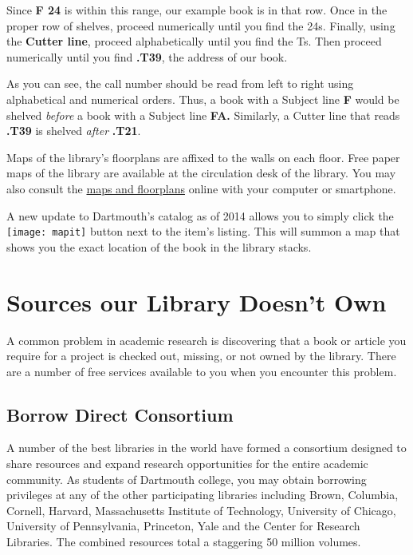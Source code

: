 Since \textbf{F 24} is within this range, our example book is in that row. Once
in the proper row of shelves, proceed numerically until you find the 24s.
Finally, using the \textbf{Cutter line}, proceed alphabetically until you find
the Ts. Then proceed numerically until you find \textbf{.T39}, the address of our book.

As you can see, the call number should be read from left to right using
alphabetical and numerical orders. Thus, a book with a Subject line \textbf{F
}would be shelved \emph{before} a book with a Subject line \textbf{FA.}
Similarly, a Cutter line that reads \textbf{.T39} is shelved \emph{after}
\textbf{.T21}.

Maps of the library's floorplans are affixed to the walls on each floor. Free
paper maps of the library are available at the circulation desk of the library.
You may also consult the
\href{http://www.dartmouth.edu/~library/bakerberry/circ/stacksguides/}{maps and
floorplans} online with your computer or smartphone.

\begin{center}
\begin{tcolorbox}[colframe=oyster, coltitle=black, sharp corners, title=\ding{52} Note]
A new update to Dartmouth's catalog as of 2014
allows you to simply click the \texttt{[image: mapit]} button next
to the item's listing. This will summon a map that shows you the exact location
of the book in the library stacks.
\end{tcolorbox}
\end{center}

\section{Sources our Library Doesn't Own}

A common problem in academic research is discovering that a book or article you
require for a project is checked out, missing, or not owned by the library.
There are a number of free services available to you when you encounter this
problem.

\subsection{Borrow Direct Consortium}

A number of the best libraries in the world have formed a consortium
designed to share resources and expand research opportunities for the  entire academic
community. As students of Dartmouth college, you may obtain  borrowing
privileges at any of the other participating libraries including Brown,
Columbia, Cornell, Harvard, Massachusetts Institute of Technology, University of
Chicago, University of Pennsylvania, Princeton, Yale and the Center for Research
Libraries. The combined resources total a staggering 50 million volumes.

